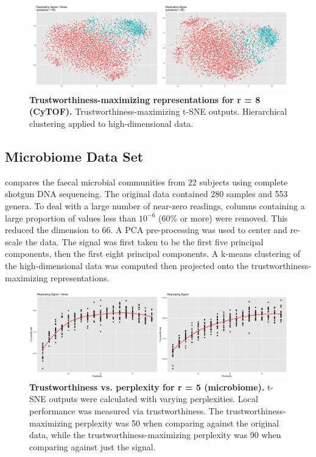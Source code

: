 \documentclass{article}
\begin{document}
\begin{figure}[H]
\centering
\includegraphics[scale=0.7]{Fig S10}
\caption{{\bf Trustworthiness-maximizing representations for r = 8 (CyTOF).}
Trustworthiness-maximizing t-SNE outputs. Hierarchical clustering applied to high-dimensional data.}
\end{figure}

\subsection{Microbiome Data Set}
\cite{enterotype data} compares the faecal microbial communities from 22 subjects using complete shotgun DNA sequencing. The original data contained 280 samples and 553 genera. To deal with a large number of near-zero readings, columns containing a large proportion of values less than $10^{-6}$ (60\% or more) were removed. This reduced the dimension to 66. A PCA pre-processing was used to center and re-scale the data. The signal was first taken to be the first five principal components, then the first eight principal components. A k-means clustering of the high-dimensional data was computed then projected onto the trustworthiness-maximizing representations.

\begin{figure}[H]
\centering
\includegraphics[scale=0.85]{Fig S11}
\caption{{\bf Trustworthiness vs. perplexity for r = 5 (microbiome).}
t-SNE outputs were calculated with varying perplexities. Local performance was measured via trustworthiness. The trustworthiness-maximizing perplexity was 50 when comparing against the original data, while the trustworthiness-maximizing perplexity was 90 when comparing against just the signal.}
\end{figure}
\end{document}

